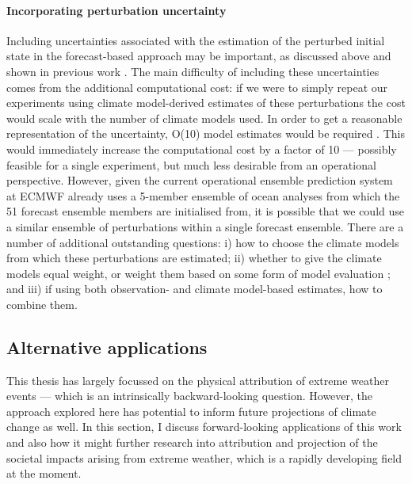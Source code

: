     \paragraph*{Incorporating perturbation uncertainty}

      Including uncertainties associated with the estimation of the perturbed initial state in the forecast-based approach may be important, as discussed above and shown in previous work \citep{pall_anthropogenic_2011,sparrow_attributing_2018}. The main difficulty of including these uncertainties comes from the additional computational cost: if we were to simply repeat our experiments using climate model-derived estimates of these perturbations the cost would scale with the number of climate models used. In order to get a reasonable representation of the uncertainty, O(10) model estimates would be required \citep[as in][]{sparrow_attributing_2018}. This would immediately increase the computational cost by a factor of 10 --- possibly feasible for a single experiment, but much less desirable from an operational perspective. However, given the current operational ensemble prediction system at ECMWF already uses a 5-member ensemble of ocean analyses from which the 51 forecast ensemble members are initialised from, it is possible that we could use a similar ensemble of perturbations within a single forecast ensemble. There are a number of additional outstanding questions: i) how to choose the climate models from which these perturbations are estimated; ii) whether to give the climate models equal weight, or weight them based on some form of model evaluation \citep[this is especially relevant for the latest generation of climate models, the CMIP6 ensemble,][]{eyring_overview_2016,hausfather_climate_2022}; and iii) if using both observation- and climate model-based estimates, how to combine them.

  \subsection{Alternative applications}

    This thesis has largely focussed on the physical attribution of extreme weather events --- which is an intrinsically backward-looking question. However, the approach explored here has potential to inform future projections of climate change as well. In this section, I discuss forward-looking applications of this work and also how it might further research into attribution and projection of the societal impacts arising from extreme weather, which is a rapidly developing field at the moment.

